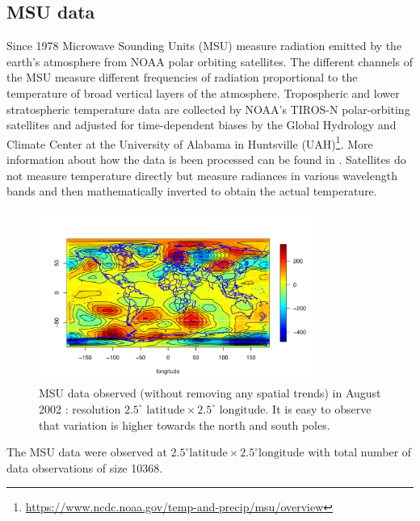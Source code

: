 \subsection{MSU data}

Since 1978 Microwave Sounding Units (MSU) measure radiation emitted by the earth's atmosphere from NOAA polar orbiting satellites. The different channels of the MSU measure different frequencies of radiation proportional to the temperature of broad vertical layers of the atmosphere. Tropospheric and lower stratospheric temperature data are collected by NOAA's TIROS-N polar-orbiting satellites and adjusted for time-dependent biases by the Global Hydrology and Climate Center at the University of Alabama in Huntsville (UAH)\footnote{\url{https://www.ncdc.noaa.gov/temp-and-precip/msu/overview}}. More information about how the data is been processed can be found in \cite{ChristySpencerBraswell2000}. Satellites do not measure temperature directly but measure radiances in various wavelength bands and then mathematically inverted to obtain the actual temperature.


\begin{figure}[H]
\label{MSU_data}
\centering
\includegraphics [width=0.8\textwidth, keepaspectratio]{graphs/MSU_data.pdf}
\caption{MSU data observed (without removing any spatial trends) in August 2002 : resolution $2.5^\circ \mbox{ latitude} \times 2.5^\circ \mbox{ longitude}$. It is easy to observe that variation is higher towards the north and south poles.}
\end{figure}

The MSU data were observed at $2.5^\circ \mbox{latitude} \times 2.5^\circ \mbox{longitude}$ with total number of data observations of size 10368.


